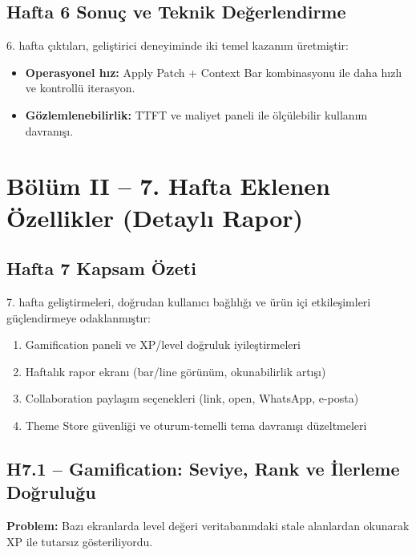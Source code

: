 \documentclass[12pt,a4paper]{article}
\begin{document}
\subsection{Hafta 6 Sonuç ve Teknik Değerlendirme}

6. hafta çıktıları, geliştirici deneyiminde iki temel kazanım üretmiştir:
\begin{itemize}[leftmargin=*]
  \item \textbf{Operasyonel hız:} Apply Patch + Context Bar kombinasyonu ile daha hızlı ve kontrollü iterasyon.
  \item \textbf{Gözlemlenebilirlik:} TTFT ve maliyet paneli ile ölçülebilir kullanım davranışı.
\end{itemize}

\newpage
\section{Bölüm II -- 7. Hafta Eklenen Özellikler (Detaylı Rapor)}

\subsection{Hafta 7 Kapsam Özeti}

7. hafta geliştirmeleri, doğrudan kullanıcı bağlılığı ve ürün içi etkileşimleri güçlendirmeye odaklanmıştır:
\begin{enumerate}[leftmargin=*, label=\textbf{H7.\arabic*.}]
  \item Gamification paneli ve XP/level doğruluk iyileştirmeleri
  \item Haftalık rapor ekranı (bar/line görünüm, okunabilirlik artışı)
  \item Collaboration paylaşım seçenekleri (link, open, WhatsApp, e-posta)
  \item Theme Store güvenliği ve oturum-temelli tema davranışı düzeltmeleri
\end{enumerate}

\subsection{H7.1 -- Gamification: Seviye, Rank ve İlerleme Doğruluğu}

\textbf{Problem:} Bazı ekranlarda level değeri veritabanındaki stale alanlardan okunarak XP ile tutarsız gösteriliyordu.
\end{document}
